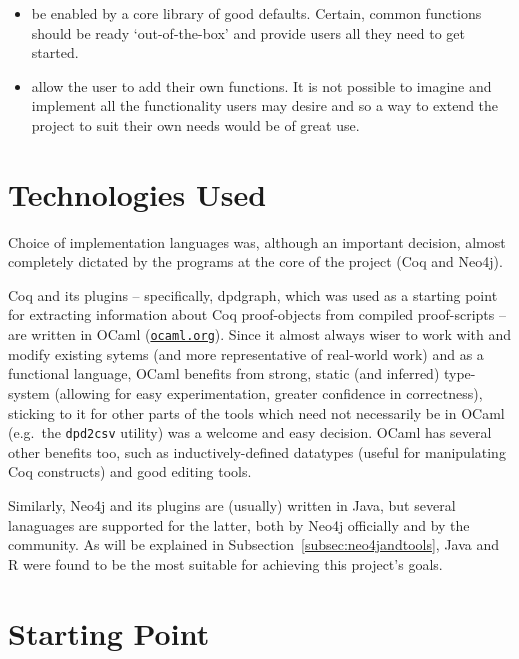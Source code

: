 \begin{itemize}
\begin{itemize}
    \item be enabled by a core library of good defaults. Certain, common
          functions should be ready `out-of-the-box' and provide users
          all they need to get started.

    \item allow the user to add their own functions. It is not possible
          to imagine and implement all the functionality users may desire and
          so a way to extend the project to suit their own needs would be of
          great use.

  \end{itemize}


\end{itemize}

\section{Technologies Used}

Choice of implementation languages was, although an important decision, almost
completely dictated by the programs at the core of the project (Coq and Neo4j).

Coq and its plugins -- specifically, dpdgraph, which was used as a starting
point for extracting information about Coq proof-objects from compiled
proof-scripts -- are written in OCaml
(\href{http://ocaml.org}{\texttt{ocaml.org}}).  Since it almost always wiser to
work with and modify existing sytems (and more representative of real-world
work) and as a functional language, OCaml benefits from strong, static (and
inferred) type-system (allowing for easy experimentation, greater confidence in
correctness), sticking to it for other parts of the tools which need not
necessarily be in OCaml (e.g.\ the {\tt dpd2csv} utility) was a welcome and
easy decision. OCaml has several other benefits too, such as
inductively-defined datatypes (useful for manipulating Coq constructs) and good
editing tools.

Similarly, Neo4j and its plugins are (usually) written in Java, but several
lanaguages are supported for the latter, both by Neo4j officially and by the
community. As will be explained in Subsection~\ref{subsec:neo4jandtools}, Java
and R were found to be the most suitable for achieving this project's goals.

\section{Starting Point}

